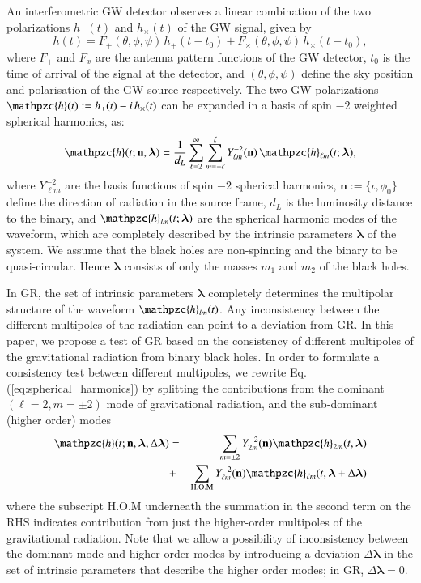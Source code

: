 \documentclass[prl,preprintnumbers,twocolumn,eqsecnum,floatfix,a4paper,nofootinbib,superscriptaddress]{revtex4}
\newcommand{\h}{\mathpzc{h}}
\newcommand{\hlm}{\mathpzc{h}_{\ell m}}
\newcommand{\Ylm}{{Y}^{-2}_{\ell m}}
\newcommand{\blambda}{\bm{\lambda}}
\newcommand{\n}{\mathbf{n}}
\begin{document}

An interferometric GW detector observes a linear combination of the two polarizations $h_+(t)$ and $h_\times(t)$ of the GW signal, given by 
\begin{equation}
h(t) = F_+(\theta, \phi, \psi) \, h_+(t-t_0) + F_{\times}(\theta, \phi, \psi)\, {h}_{\times}(t-t_0), 
\label{eq:det_response}
\end{equation}
where $F_+$ and $F_x$ are the antenna pattern functions of the GW detector, $t_0$ is the time of arrival of the signal at the detector, and $(\theta, \phi, \psi)$ define the sky position and polarisation of the GW source respectively. The two GW polarizations $\h(t) := h_+(t) - i \, h_\times(t)$ can be expanded in a basis of spin $-2$ weighted spherical harmonics, as:
\begin{equation}
\h(t; \n, \blambda) =  \frac{1}{d_L} \sum _{\ell=2}^{\infty} \sum _{m=-\ell}^{\ell} \Ylm (\n) \, {{\hlm}(t; \blambda)}, 
\label{eq:spherical_harmonics}
\end{equation}
where $\Ylm$ are the basis functions of spin $-2$ spherical harmonics, $\n := \{\iota, \phi_0\}$ define the direction of radiation in the source frame, $d_L$ is  the luminosity distance to the binary, and ${\h}_{lm}(t; \blambda)$ are the spherical harmonic modes of the waveform, which are completely described by the intrinsic parameters $\blambda$ of the system. We assume that the black holes are non-spinning and the binary to be quasi-circular. Hence $\blambda$ consists of only the masses $m_1$ and $m_2$ of the black holes. 

In GR, the set of intrinsic parameters $\blambda$ completely determines the multipolar structure of the waveform ${\h}_{lm}(t)$. Any inconsistency between the different multipoles of the radiation can point to a deviation from GR. In this paper, we propose a test of GR based on the consistency of different multipoles of the gravitational radiation from binary black holes. In order to formulate a consistency test between different multipoles, we rewrite Eq.(\ref{eq:spherical_harmonics}) by splitting the contributions from the dominant $(\ell = 2, m = \pm 2)$ mode of gravitational radiation, and the sub-dominant (higher order) modes 
\begin{eqnarray}
\h(t; \n, \blambda, \Delta \blambda) & = & \sum_{m = \pm2} Y^{-2}_{2m} (\n) {\h}_{2m}(t, \blambda)  \nonumber \\ 
& + & \sum _{\text{H.O.M}} \Ylm (\n) \hlm(t, \blambda+\Delta \blambda)
\label{eq:test_HM}
\end{eqnarray}
where the subscript H.O.M underneath the summation in the second term on the RHS indicates contribution from just the higher-order multipoles of the gravitational radiation. Note that we allow a possibility of inconsistency between the dominant mode and higher order modes by introducing a deviation $\Delta \blambda$ in the set of intrinsic parameters that describe the higher order modes; in GR,  $\Delta \blambda = 0$. 
\end{document}
